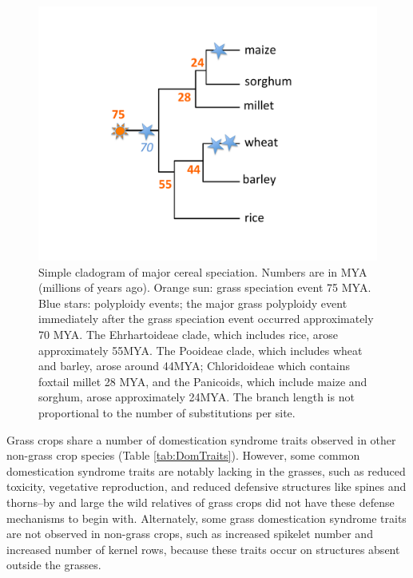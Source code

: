 \documentclass[12pt]{article}
\begin{document}
\begin{figure}[h]
    \centering
    \includegraphics[width=15cm]{Figure_1.pdf}
    \caption{Simple cladogram of major cereal speciation. Numbers are in MYA (millions of years ago).
Orange sun: grass speciation event 75 MYA.  Blue stars: polyploidy events; 
the major grass polyploidy event immediately after the grass speciation event occurred 
approximately 70 MYA. The Ehrhartoideae clade, which includes rice, arose 
approximately 55MYA. The Pooideae clade, which includes wheat and barley, 
arose around 44MYA; Chloridoideae which contains foxtail millet 28 MYA, and the Panicoids, 
which include maize and sorghum, arose approximately 24MYA. The branch length is not 
proportional to the number of substitutions per site.
}
    \label{fig:grassphylo}
\end{figure}

Grass crops share a number of domestication syndrome traits observed in other non-grass crop species (Table \ref{tab:DomTraits}).
However, some common domestication syndrome traits are notably lacking in the grasses, such as reduced toxicity, vegetative reproduction, and reduced defensive structures like spines and thorns--by and large the wild relatives of grass crops did not have these defense mechanisms to begin with.
Alternately, some grass domestication syndrome traits are not observed in non-grass crops, such as increased spikelet number and increased number of kernel rows, because these traits occur on structures absent outside the grasses.  
\end{document}
